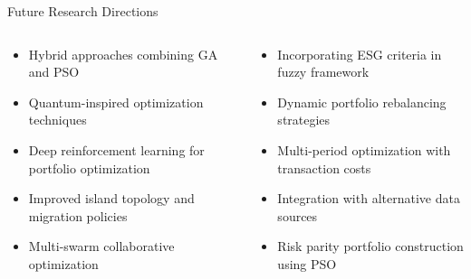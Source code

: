 \documentclass[aspectratio=169,xcolor=table]{beamer}
\begin{document}
\begin{frame}{Future Research Directions}
  \begin{columns}
    \begin{column}{0.48\textwidth}
      \begin{tcolorbox}[
        enhanced,
        colback=blue!5,
        colframe=blue!70,
        arc=2mm,
        title=Algorithmic Improvements,
        fonttitle=\bfseries\large,
        boxrule=0.5mm
      ]
        \begin{itemize}
          \item Hybrid approaches combining GA and PSO
          \item Quantum-inspired optimization techniques
          \item Deep reinforcement learning for portfolio optimization
          \item Improved island topology and migration policies
          \item Multi-swarm collaborative optimization
        \end{itemize}
      \end{tcolorbox}
    \end{column}
    \begin{column}{0.48\textwidth}
      \begin{tcolorbox}[
        enhanced,
        colback=green!5,
        colframe=green!70,
        arc=2mm,
        title=Application Extensions,
        fonttitle=\bfseries\large,
        boxrule=0.5mm
      ]
        \begin{itemize}
          \item Incorporating ESG criteria in fuzzy framework
          \item Dynamic portfolio rebalancing strategies
          \item Multi-period optimization with transaction costs
          \item Integration with alternative data sources
          \item Risk parity portfolio construction using PSO
        \end{itemize}
      \end{tcolorbox}
    \end{column}
  \end{columns}
  
  \vspace{0.5cm}
  

\end{frame}
\end{document}
